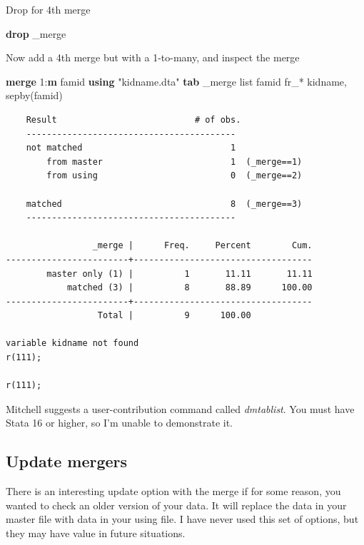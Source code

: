 \documentclass[
]{book}
\newenvironment{Shaded}{\begin{snugshade}}{\end{snugshade}}
\newcommand{\DataTypeTok}[1]{\textcolor[rgb]{0.13,0.29,0.53}{#1}}
\newcommand{\FunctionTok}[1]{\textcolor[rgb]{0.13,0.29,0.53}{\textbf{#1}}}
\newcommand{\KeywordTok}[1]{\textcolor[rgb]{0.13,0.29,0.53}{\textbf{#1}}}
\newcommand{\NormalTok}[1]{#1}
\newcommand{\OtherTok}[1]{\textcolor[rgb]{0.56,0.35,0.01}{#1}}
\newcommand{\StringTok}[1]{\textcolor[rgb]{0.31,0.60,0.02}{#1}}
\begin{document}
Drop for 4th merge

\begin{Shaded}
\begin{Highlighting}[]
\KeywordTok{drop} \DataTypeTok{\_merge}
\end{Highlighting}
\end{Shaded}

Now add a 4th merge but with a 1-to-many, and inspect the merge

\begin{Shaded}
\begin{Highlighting}[]
\KeywordTok{merge}\NormalTok{ 1:}\FunctionTok{m}\NormalTok{ famid }\KeywordTok{using} \StringTok{"kidname.dta"}
\KeywordTok{tab} \DataTypeTok{\_merge}
\OtherTok{list}\NormalTok{ famid fr\_* kidname, sepby(famid)}
\end{Highlighting}
\end{Shaded}

\begin{verbatim}
    Result                           # of obs.
    -----------------------------------------
    not matched                             1
        from master                         1  (_merge==1)
        from using                          0  (_merge==2)

    matched                                 8  (_merge==3)
    -----------------------------------------

                 _merge |      Freq.     Percent        Cum.
------------------------+-----------------------------------
        master only (1) |          1       11.11       11.11
            matched (3) |          8       88.89      100.00
------------------------+-----------------------------------
                  Total |          9      100.00

variable kidname not found
r(111);

r(111);
\end{verbatim}

Mitchell suggests a user-contribution command called \emph{dmtablist}. You must have Stata 16 or higher, so I'm unable to demonstrate it.

\subsection{Update mergers}\label{update-mergers}

There is an interesting update option with the merge if for some reason, you wanted to check an older version of your data. It will replace the data in your master file with data in your using file. I have never used this set of options, but they may have value in future situations.
\end{document}
